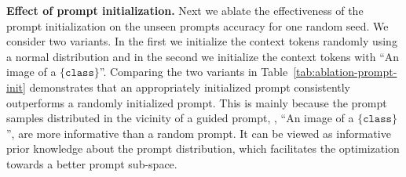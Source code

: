 \documentclass[10pt,twocolumn,letterpaper]{article}
\begin{document}
\textbf{Effect of prompt initialization.}
Next we ablate the effectiveness of the prompt initialization on the unseen prompts accuracy for one random seed. We consider two variants. In the first we initialize the context tokens randomly using a normal distribution and in the second we initialize the context tokens with ``An image of a $\{\texttt{class}\}$''. Comparing the two variants in Table~\ref{tab:ablation-prompt-init} demonstrates that an appropriately initialized prompt consistently outperforms a randomly initialized prompt. This is mainly because the prompt samples distributed in the vicinity of a guided prompt, \eg, ``An image of a $\{\texttt{class}\}$'', are more informative than a random prompt. It can be viewed as informative prior knowledge about the prompt distribution, which facilitates the optimization towards a better prompt sub-space. 

\begin{table}[t!]
\centering
\caption{\textbf{Effect of prompt initialization.} Initializing the context tokens with an appropriate prompt ``An image of a $\{\texttt{class}\}$'' (denoted as Guided) improves the performance compared to random initialization.}
\vspace{-2mm}
\label{tab:ablation-prompt-init}
\vspace{-5mm}
\end{table} 
\end{document}
